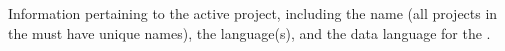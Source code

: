 
\item[Project Properties]{
Information pertaining to the active project, including the name (all projects in the \gddb must have 
unique names), the \gdproject language(s), and the data language for the 
\gdproject{}. 
}
